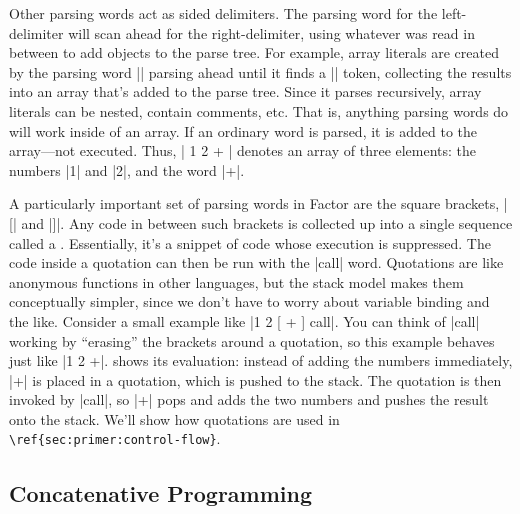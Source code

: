 Other parsing words act as sided delimiters.  The parsing word for the
left-delimiter will scan ahead for the right-delimiter, using whatever was read
in between to add objects to the parse tree.  For example, array literals are
created by the parsing word \inlinecode|{| parsing ahead until it finds a
\inlinecode|}| token, collecting the results into an array that's added to the
parse tree.  Since it parses recursively, array literals can be nested, contain
comments, etc.  That is, anything parsing words do will work
inside of an array.  If an ordinary word is parsed, it is added to the
array---not executed.  Thus, \inlinecode|{ 1 2 + }| denotes an array of three
elements: the numbers \inlinecode|1| and \inlinecode|2|, and the word
\inlinecode|+|.



A particularly important set of parsing words in Factor are the square
brackets, \inlinecode|[| and \inlinecode|]|.  Any code in between such brackets
is collected up into a single sequence called a .  Essentially,
it's a snippet of code whose execution is suppressed.  The code inside a
quotation can then be run with the \inlinecode|call| word.  Quotations are like
anonymous functions in other languages, but the stack model makes them
conceptually simpler, since we don't have to worry about variable binding and
the like.  Consider a small example like \inlinecode|1 2 [ + ] call|.  You can
think of \inlinecode|call| working by ``erasing'' the brackets around a
quotation, so this example behaves just like \inlinecode|1 2 +|.
 shows its evaluation: instead of adding the numbers
immediately, \inlinecode|+| is placed in a quotation, which is pushed to the
stack.  The quotation is then invoked by \inlinecode|call|, so \inlinecode|+|
pops and adds the two numbers and pushes the result onto the stack.  We'll show
how quotations are used in \verb|\ref{sec:primer:control-flow}|.


\subsection{Concatenative Programming}

